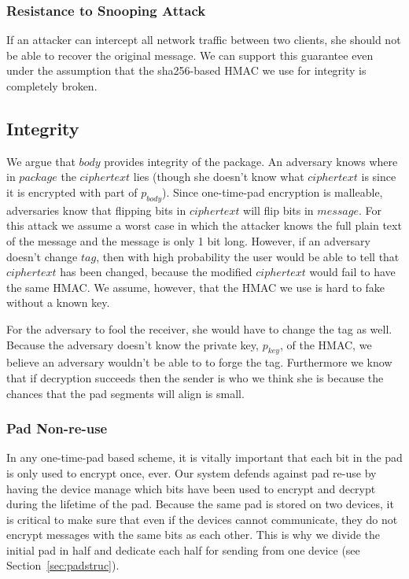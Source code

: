 \documentclass[twocolumn]{article}
\begin{document}
\subsubsection{Resistance to Snooping Attack}
If an attacker can intercept all network traffic between two clients, she should not be able to recover the original message.
We can support this guarantee even under the assumption that the sha256-based HMAC we use for integrity is completely broken.

\subsection{Integrity}
\label{sec:hmac}
We argue that $body$ provides integrity of the package. An adversary knows where in $package$ the $ciphertext$ lies (though she doesn't know what $ciphertext$ is since it is encrypted with part of $p_{body}$). Since one-time-pad encryption is malleable, adversaries know that flipping bits in $ciphertext$ will flip bits in $message$. For this attack we assume a worst case in which the attacker knows the full plain text of the message and the message is only 1 bit long. However, if an adversary doesn't change $tag$, then with high probability the user would be able to tell that $ciphertext$ has been changed, because the modified $ciphertext$ would fail to have the same HMAC. We assume, however, that the HMAC we use is hard to fake without a known key.

For the adversary to fool the receiver, she would have to change the tag as well. Because the adversary doesn't know the private key, $p_{key}$, of the HMAC, we believe an adversary wouldn't be able to to forge the tag. Furthermore we know that if decryption succeeds then the sender is who we think she is because the chances that the pad segments will align is small.

\subsubsection{Pad Non-re-use}
In any one-time-pad based scheme, it is vitally important that each bit in the pad is only used to encrypt once, ever.
Our system defends against pad re-use by having the device manage which bits have been used to encrypt and decrypt during the lifetime of the pad.
Because the same pad is stored on two devices, it is critical to make sure that even if the devices cannot communicate, they do not encrypt messages with the same bits as each other. This is why we divide the initial pad in half and dedicate each half for sending from one device (see Section~\ref{sec:padstruc}).
\end{document}
